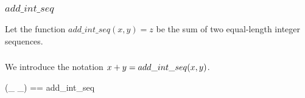 \documentclass[11pt, oneside]{article}
\begin{document}
\subsubsection{$add\_int\_seq$}

Let the function $add\_int\_seq(x, y) = z$ be the sum of two equal-length integer sequences.


\subsubsection{}

We introduce the notation $x \mathbin{+} y = add\_int\_seq(x, y)$.

\begin{zed}
	(\_ \addSeqZ \_) == add\_int\_seq
\end{zed}

\printbibliography
\end{document}
